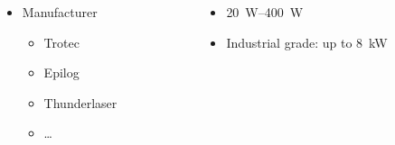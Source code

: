 \begin{frame}
    \begin{columns}
        \begin{column}[t]{0.5\textwidth}
            \begin{itemize}
                \item Manufacturer
                      \begin{itemize}
                          \item Trotec
                          \item Epilog
                          \item Thunderlaser
                          \item \ldots
                      \end{itemize}
            \end{itemize}
        \end{column}
        \begin{column}[t]{0.5\textwidth}
            \begin{itemize}
                \item \SIrange{20}{400}{\watt}
                \item Industrial grade: up to \SI{8}{\kilo\watt}
            \end{itemize}
        \end{column}
    \end{columns}
    \begin{columns}
        \begin{column}{0.5\textwidth}
            \begin{figure}

\end{figure}
\end{column}
\end{columns}
\end{frame}
